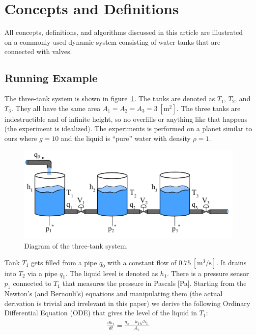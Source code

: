 \section{Concepts and Definitions}\label{sec:concepts}
%
All concepts, definitions, and algorithms discussed in this article
are illustrated on a commonly used dynamic system consisting of water
tanks that are connected with valves.
%
\subsection{Running Example}
%
The three-tank system is shown in figure~\ref{fig:three_tanks}. The
tanks are denoted as $T_1$, $T_2$, and $T_3$. They all have the
same area $A_1 = A_2 = A_3 = 3~[\textrm{m}^2]$. The three tanks are
indestructible and of infinite height, so no overfills or anything
like that happens (the experiment is idealized). The experiments is
performed on a planet similar to ours where $g = 10$ and the liquid is
``pure'' water with density $\rho = 1$.
%
\begin{figure}[htb]
  \centering
  \includegraphics[width=1\columnwidth]{3-tanks}
  \caption{Diagram of the three-tank system.}
  \label{fig:three_tanks}
\end{figure}
\par\noindent
%
Tank $T_1$ gets filled from a pipe $q_0$ with a constant flow of
$0.75~[\textrm{m}^3/\textrm{s}]$. It drains into $T_2$ via a pipe
$q_1$. The liquid level is denoted as $h_1$. There is a pressure
sensor $p_1$ connected to $T_1$ that measures the pressure in Pascals
[Pa]. Starting from the Newton's (and Bernouli's) equations and
manipulating them (the actual derivation is trivial and irrelevant in
this paper) we derive the following Ordinary Differential Equation
(ODE) that gives the level of the liquid in $T_1$:
%
\begin{eqnarray}
%
\frac{d h_1}{dt} = \frac{q_0 - k_1 \sqrt{h_1}}{A_1}\label{eq:ode1}
%
\end{eqnarray}
